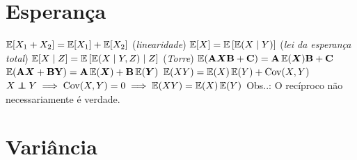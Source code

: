 \section{Esperança}

\begin{theorem}
	\leavevmode
	\begin{outline}[enumerate]
		\1 \( \E[X_1+X_2] = \E[X_1] + \E[X_2] \) (\textit{linearidade})
		\1 \( \E[X] = \E\left[\E(X \mid Y) \right] \) (\textit{lei da esperança total})
		\1 \( \E[X \mid Z] = \E \left[ \E(X \mid Y, Z) \mid Z \right] \) (\textit{Torre})
		\1 \( \E(\m{A}\v{X}\m{B} + \m{C}) = \m{A}\E(\v{X})\m{B}+\m{C}\)
		\1 \( \E(\m{A}\v{X} + \m{B\v{Y}}) = \m{A}\E(\v{X}) + \m{B}\E(\v{Y}) \)
		\1 \( \E(XY) = \E(X)\E(Y) + \Cov(X,Y)\)
		\1 \( X \indep Y \implies \Cov(X,Y)=0 \implies \E(XY) = \E(X)\E(Y) \)
			\2 Obs..: O recíproco não necessariamente é verdade. 
	\end{outline}
\end{theorem}

\section{Variância}

